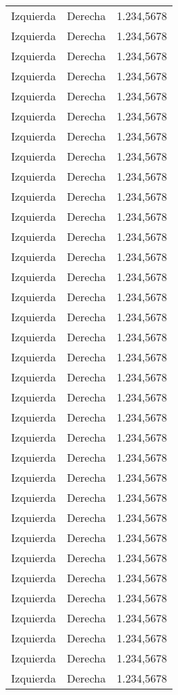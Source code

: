 \begin{longtable}{l|r|c}
  Izquierda & Derecha & 1.234,5678 \\
  Izquierda & Derecha & 1.234,5678 \\
  Izquierda & Derecha & 1.234,5678 \\
  Izquierda & Derecha & 1.234,5678 \\
  Izquierda & Derecha & 1.234,5678 \\
  Izquierda & Derecha & 1.234,5678 \\
  Izquierda & Derecha & 1.234,5678 \\
  Izquierda & Derecha & 1.234,5678 \\
  Izquierda & Derecha & 1.234,5678 \\
  Izquierda & Derecha & 1.234,5678 \\
  Izquierda & Derecha & 1.234,5678 \\
  Izquierda & Derecha & 1.234,5678 \\
  Izquierda & Derecha & 1.234,5678 \\
  Izquierda & Derecha & 1.234,5678 \\
  Izquierda & Derecha & 1.234,5678 \\
  Izquierda & Derecha & 1.234,5678 \\
  Izquierda & Derecha & 1.234,5678 \\
  Izquierda & Derecha & 1.234,5678 \\
  Izquierda & Derecha & 1.234,5678 \\
  Izquierda & Derecha & 1.234,5678 \\
  Izquierda & Derecha & 1.234,5678 \\
  Izquierda & Derecha & 1.234,5678 \\
  Izquierda & Derecha & 1.234,5678 \\
  Izquierda & Derecha & 1.234,5678 \\
  Izquierda & Derecha & 1.234,5678 \\
  Izquierda & Derecha & 1.234,5678 \\
  Izquierda & Derecha & 1.234,5678 \\
  Izquierda & Derecha & 1.234,5678 \\
  Izquierda & Derecha & 1.234,5678 \\
  Izquierda & Derecha & 1.234,5678 \\
  Izquierda & Derecha & 1.234,5678 \\
  Izquierda & Derecha & 1.234,5678 \\
  Izquierda & Derecha & 1.234,5678 \\
  Izquierda & Derecha & 1.234,5678 \\

\end{longtable}
